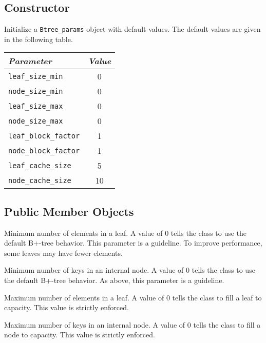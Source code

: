    {}

\etabb

\subsection{Constructor}

\btabb

   {Initialize a {\tt Btree\_params} object with
  default values. The default values are given in the following table.\\[1mm]
  \begin{tabular}{|l|c|}
    \hline
    {\em Parameter} & {\em Value} \\ \hline
    {\tt leaf\_size\_min} & 0 \\ \hline
    {\tt node\_size\_min} & 0 \\ \hline
    {\tt leaf\_size\_max} & 0 \\ \hline
    {\tt node\_size\_max} & 0 \\ \hline
    {\tt leaf\_block\_factor} & 1 \\ \hline
    {\tt node\_block\_factor} & 1 \\ \hline
    {\tt leaf\_cache\_size} & 5 \\ \hline
    {\tt node\_cache\_size} & 10 \\ \hline
  \end{tabular}
  }

\etabb

\subsection{Public Member Objects}

\btabb

   {Minimum number of elements in a leaf. A
  value of $0$ tells the class to use the default B+-tree behavior. This
  parameter is a guideline. To improve performance, some leaves may have
  fewer elements.}

   {Minimum number of keys in an internal
  node. A value of $0$ tells the class to use the default B+-tree
  behavior. As above, this parameter is a guideline.}

   {Maximum number of elements in a leaf. A
  value of $0$ tells the class to fill a leaf to capacity. This value is
  strictly enforced.}

   {Maximum number of keys in an internal
  node. A value of $0$ tells the class to fill a node to capacity. This
  value is strictly enforced.}

